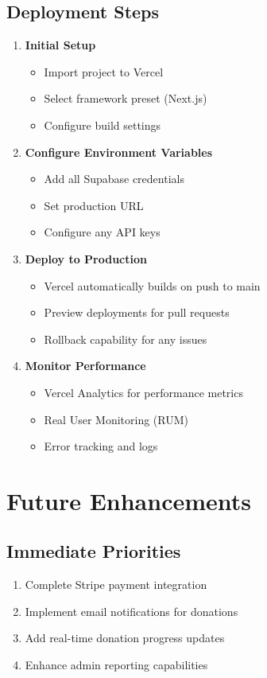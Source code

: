 \documentclass[11pt,a4paper]{article}
\begin{document}
\subsection{Deployment Steps}
\begin{enumerate}[leftmargin=*,itemsep=5pt]
    \item \textbf{Initial Setup}
    \begin{itemize}
        \item Import project to Vercel
        \item Select framework preset (Next.js)
        \item Configure build settings
    \end{itemize}
    
    \item \textbf{Configure Environment Variables}
    \begin{itemize}
        \item Add all Supabase credentials
        \item Set production URL
        \item Configure any API keys
    \end{itemize}
    
    \item \textbf{Deploy to Production}
    \begin{itemize}
        \item Vercel automatically builds on push to main
        \item Preview deployments for pull requests
        \item Rollback capability for any issues
    \end{itemize}
    
    \item \textbf{Monitor Performance}
    \begin{itemize}
        \item Vercel Analytics for performance metrics
        \item Real User Monitoring (RUM)
        \item Error tracking and logs
    \end{itemize}
\end{enumerate}

\section{Future Enhancements}

\subsection{Immediate Priorities}
\begin{enumerate}[leftmargin=*,itemsep=5pt]
    \item Complete Stripe payment integration
    \item Implement email notifications for donations
    \item Add real-time donation progress updates
    \item Enhance admin reporting capabilities
\end{enumerate}
\end{document}
